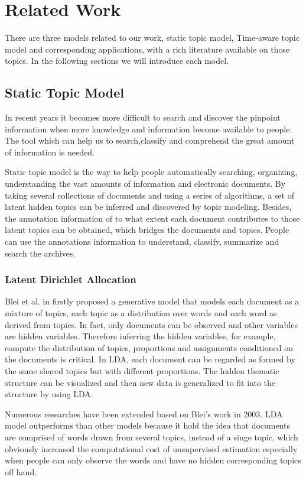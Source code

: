 \chapter{Related Work}
\label{chapterlabel2}

There are three models related to our work, static topic model, Time-aware topic model and corresponding applications, with a rich literature available on those topics. In the following sections we will introduce each model. 

\section{Static Topic Model}
In recent years it becomes more difficult to search and discover the pinpoint information when more knowledge and information become available to people. The tool which can help us to search,classify and comprehend the great amount of information is needed. 

Static topic model is the way to help people automatically searching, organizing, understanding the vast amounts of information and electronic documents. By taking several collections of documents and using a series of algorithms, a set of latent hidden topics can be inferred  and discovered by topic modeling. Besides, the annotation information of to what extent each document contributes to those latent topics can be obtained, which bridges the documents and topics. People can use the annotations information to understand, classify, summarize and search the archives.

\subsection{Latent Dirichlet Allocation}

Blei et al. in \cite{blei2003latent}firstly proposed a generative model that models each document as a mixture of topics, each topic as a distribution over words and each word as derived from topics. In fact, only documents can be observed and other variables are hidden variables. Therefore inferring the hidden variables, for example, compute the distribution of topics, proportions and assignments conditioned on the documents is critical. In LDA, each document can be regarded as formed by the same shared topics but with different proportions. The hidden thematic structure can be visualized and then new data is generalized to fit into the structure by using LDA. 

Numerous researches have been extended based on Blei's work in 2003. LDA \cite{blei2003latent}model outperforms than other models because it hold the idea that documents are comprised of words drawn from several topics, instead of a singe topic, which obviously increased the computational cost of unsupervised estimation especially when people can only observe the words and have no hidden corresponding topics off hand. 

